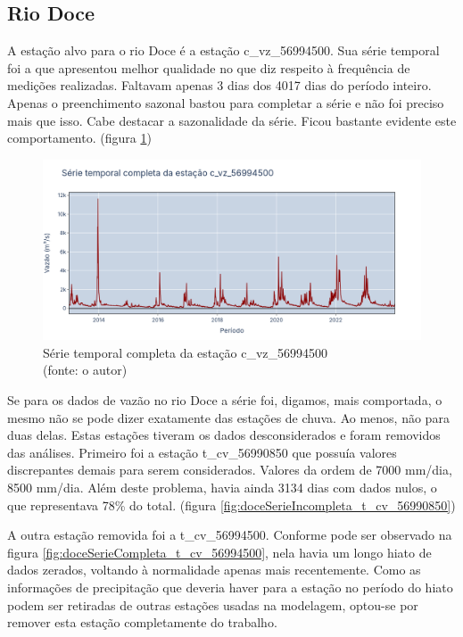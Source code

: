 \subsection{Rio Doce}

A estação alvo para o rio Doce é a estação c\_vz\_56994500. Sua série temporal foi a que apresentou melhor qualidade no que diz respeito à frequência de medições realizadas. Faltavam apenas 3 dias dos 4017 dias do período inteiro. Apenas o preenchimento sazonal bastou para completar a série e não foi preciso mais que isso. Cabe destacar a sazonalidade da série. Ficou bastante evidente este comportamento. (figura \ref{fig:doceSerieCompleta_c_vz_56994500})

\begin{figure}[!h]
	\centering
	\includegraphics[scale=0.25]{Figuras/rio_doce/doceSerieCompleta_c_vz_56994500.png}
	\caption{Série temporal completa da estação c\_vz\_56994500\\(fonte: o autor)}
	\label{fig:doceSerieCompleta_c_vz_56994500}
\end{figure}

Se para os dados de vazão no rio Doce a série foi, digamos, mais comportada, o mesmo não se pode dizer exatamente das estações de chuva. Ao menos, não para duas delas. Estas estações tiveram os dados desconsiderados e foram removidos das análises. Primeiro foi a estação t\_cv\_56990850 que possuía valores discrepantes demais para serem considerados. Valores da ordem de 7000 mm/dia, 8500 mm/dia. Além deste problema, havia ainda 3134 dias com dados nulos, o que representava 78\% do total. (figura \ref{fig:doceSerieIncompleta_t_cv_56990850})

A outra estação removida foi a t\_cv\_56994500. Conforme pode ser observado na figura \ref{fig:doceSerieCompleta_t_cv_56994500}, nela havia um longo hiato de dados zerados, voltando à normalidade apenas mais recentemente. Como as informações de precipitação que deveria haver para a estação no período do hiato podem ser retiradas de outras estações usadas na modelagem, optou-se por remover esta estação completamente do trabalho.

